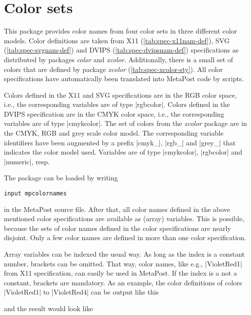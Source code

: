 \documentclass[DIV=9, captions=tableheading]{scrartcl}
\newcommand*{\name}[1]{\textsf{\mdseries\emph{#1}}}
\begin{document}
\section{Color sets}
\label{sec:colorsets}
This package provides color names from four color sets in three
different color models.  Color definitions are taken from X11
(\autoref{tab:spec-x11nam-def}), SVG (\autoref{tab:spec-svgnam-def}) and
DVIPS (\autoref{tab:spec-dvipsnam-def}) specifications as distributed by
packages \name{color} and \name{xcolor}.  Additionally, there is a small
set of colors that are defined by package \name{xcolor}
(\autoref{tab:spec-xcolor-sty}).  All color specifications have
automatically been translated into MetaPost code by scripts.

Colors defined in the X11 and SVG specifications are in the RGB color
space, i.e., the corresponding variables are of type |rgbcolor|.  Colors
defined in the DVIPS specification are in the CMYK color space, i.e.,
the corresponding variables are of type |cmykcolor|.  The set of colors
from the \name{xcolor} package are in the CMYK, RGB and grey scale color
model.  The corresponding variable identifiers have been augmented by a
prefix |cmyk_|, |rgb_| and |grey_| that indicates the color model used.
Variables are of type |cmykcolor|, |rgbcolor| and |numeric|, resp.

The package can be loaded by writing

\begin{lstlisting}[style=MP]
input mpcolornames
\end{lstlisting}
%
in the MetaPost source file.  After that, all color names defined in the
above mentioned color specifications are available as (array) variables.
This is possible, because the sets of color names defined in the color
specifications are nearly disjoint.  Only a few color names are defined
in more than one color specification.

Array variables can be indexed the usual way.  As long as the index is a
constant number, brackets can be omitted.  That way, color names, like
e.g., |VioletRed1| from X11 specification, can easily be used in
MetaPost.  If the index is a not a constant, brackets are mandatory.  As
an example, the color definitions of colors |VioletRed1| to |VioletRed4|
can be output like this


%
and the result would look like


\end{document}
